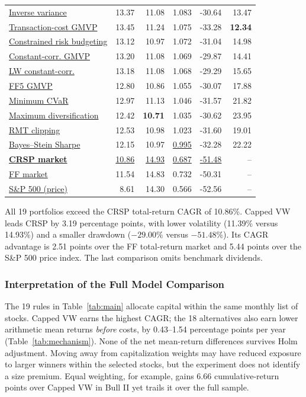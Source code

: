 \documentclass[letterpaper,journal]{IEEEtran}
\begin{document}
\begin{table}[!tp]
\begin{tabular}{lrrrrr}
\hyperref[alloc:vol_timing]{Inverse variance} & 13.37 & 11.08 & 1.083 & -30.64 & 13.47 \\
\hyperref[alloc:tc_gmvp]{Transaction-cost GMVP} & 13.45 & 11.24 & 1.075 & -33.28 & \textbf{12.34} \\
\hyperref[alloc:erc]{Constrained risk budgeting} & 13.12 & 10.97 & 1.072 & -31.04 & 14.98 \\
\hyperref[alloc:gmvp_constant_corr]{Constant-corr. GMVP} & 13.20 & 11.08 & 1.069 & -29.87 & 14.41 \\
\hyperref[alloc:gmvp_lw_constant_corr]{LW constant-corr.} & 13.18 & 11.08 & 1.068 & -29.29 & 15.65 \\
\hyperref[alloc:gmvp_factor]{FF5 GMVP} & 12.80 & 10.86 & 1.055 & -30.07 & 17.88 \\
\hyperref[alloc:min_cvar]{Minimum CVaR} & 12.97 & 11.13 & 1.046 & -31.57 & 21.82 \\
\hyperref[alloc:mdp]{Maximum diversification} & 12.42 & \textbf{10.71} & 1.035 & -30.62 & 23.95 \\
\hyperref[alloc:gmvp_rmt_clipping]{RMT clipping} & 12.53 & 10.98 & 1.023 & -31.60 & 19.01 \\
\hyperref[alloc:max_sharpe_bs]{Bayes--Stein Sharpe} & 12.15 & 10.97 & \underline{0.995} & -32.28 & 22.22 \\
\midrule
\textbf{\hyperref[alloc:CRSP_market]{CRSP market}} & \underline{10.86} & \underline{14.93} & \underline{0.687} & \underline{-51.48} & -- \\
\hyperref[alloc:FF_market]{FF market} & 11.54 & 14.83 & 0.732 & -50.31 & -- \\
\hyperref[alloc:SP500]{S\&P 500 (price)} & 8.61 & 14.30 & 0.566 & -52.56 & -- \\
\bottomrule\end{tabular}
\end{table}

All 19 portfolios exceed the CRSP total-return CAGR of 10.86\%. Capped VW leads CRSP by 3.19 percentage points, with lower volatility (11.39\% versus 14.93\%) and a smaller drawdown ($-29.00\%$ versus $-51.48\%$). Its CAGR advantage is 2.51 points over the FF total-return market and 5.44 points over the S\&P 500 price index. The last comparison omits benchmark dividends.


\subsubsection{Interpretation of the Full Model Comparison}\label{sec:fullmodelinterpretation}
The 19 rules in Table~\ref{tab:main} allocate capital within the same monthly list of stocks. Capped VW earns the highest CAGR; the 18 alternatives also earn lower arithmetic mean returns \emph{before} costs, by 0.43--1.54 percentage points per year (Table~\ref{tab:mechanism}). None of the net mean-return differences survives Holm adjustment. Moving away from capitalization weights may have reduced exposure to larger winners within the selected stocks, but the experiment does not identify a size premium. Equal weighting, for example, gains 6.66 cumulative-return points over Capped VW in Bull II yet trails it over the full sample.
\end{document}
